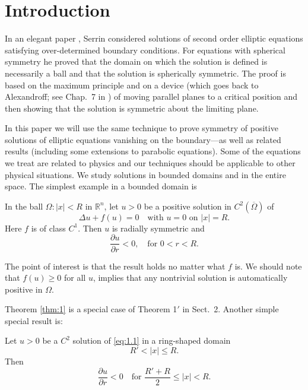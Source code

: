 \section{Introduction}

In an elegant paper \cite{serrin_symmetry_1971},
Serrin considered solutions of second order elliptic equations satisfying 
over-determined boundary conditions. For equations with spherical symmetry he proved that the 
domain on which the solution is defined is necessarily a ball and that the solution is spherically 
symmetric. The proof is based on the maximum principle and on a device (which goes back to 
Alexandroff; see Chap.~7 in \cite{hopf_differential_2003}) of moving parallel planes 
to a critical position and then showing 
that the solution is symmetric about the limiting plane.

In this paper we will use the same technique to prove symmetry of positive solutions of elliptic 
equations vanishing on the boundary---as well as related results (including some extensions to 
parabolic equations). Some of the equations we treat are related to physics and our techniques 
should be applicable to other physical situations. We study solutions in bounded domains and in 
the entire space. The simplest example in a bounded domain is

\begin{theorem}\label{thm:1}
  In the ball $\Omega: |x|<R$ in $\mathbb{R}^n$, let $u>0$ be a positive solution
  in $C^2(\overline{\Omega})$ of
  \begin{equation}\label{eq:1.1}
    \Delta u + f(u) = 0 \quad \text{with } u=0 \text{ on } |x|=R. 
  \end{equation}
  Here $f$ is of class $C^1$. Then $u$ is radially symmetric and
  \[\frac{\partial u}{\partial r} < 0,\quad \text{for } 0<r<R.\]
\end{theorem}

The point of interest is that the result holds no matter what $f$ is.
We should note that $f(u)\geq 0$ for all $u$,
implies that any nontrivial solution is automatically positive in $\Omega$.

Theorem \ref{thm:1} is a special case of Theorem 1$'$ in Sect.~2.
Another simple special result is:

\begin{theorem}\label{thm:2}
  Let $u>0$ be a $C^2$ solution of \eqref{eq:1.1} in a ring-shaped domain
  \[R' < |x| \leq R.\]
  Then
  \begin{equation}
    \frac{\partial u}{\partial r} < 0 \quad \text{for } \frac{R'+R}{2}\leq |x| < R.
  \end{equation}
\end{theorem}

